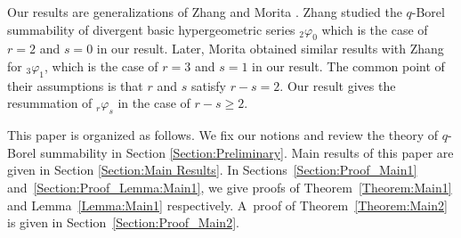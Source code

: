 Our results are generalizations of Zhang \cite{Zhang2002} and Morita \cite{Morita2014}. Zhang studied the $q$-Borel summability of divergent basic hypergeometric series ${}_2\varphi_0$ which is the case of $r=2$ and $s=0$ in our result. Later, Morita obtained similar results with Zhang for ${}_3\varphi_1$, which is the case of $r=3$ and $s=1$ in our result. The common point of their assumptions is that $r$ and $s$ satisfy $r-s=2$. Our result gives the resummation of ${}_r\varphi_s$ in the case of $r-s\ge2$.

This paper is organized as follows. We fix our notions and review the theory of $q$-Borel summability in Section \ref{Section:Preliminary}. Main results of this paper are given in Section \ref{Section:Main Results}. In Sections~\ref{Section:Proof_Main1} and~\ref{Section:Proof_Lemma:Main1}, we give proofs of Theorem~\ref{Theorem:Main1} and Lemma~\ref{Lemma:Main1} respectively. A~proof of Theorem~\ref{Theorem:Main2} is given in Section~\ref{Section:Proof_Main2}.

